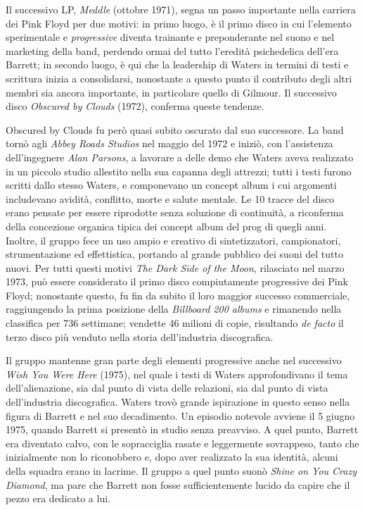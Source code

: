 \documentclass[class=book, crop=false, oneside, 12pt]{standalone}
\begin{document}
    Il successivo LP, \emph{Meddle} (ottobre 1971), segna un passo importante nella carriera dei Pink Floyd per due motivi: in primo luogo, è il primo disco in cui l'elemento sperimentale e \emph{progressive} diventa trainante e preponderante nel suono e nel marketing della band, perdendo ormai del tutto l'eredità psichedelica dell'era Barrett; in secondo luogo, è qui che la leadership di Waters in termini di testi e scrittura inizia a consolidarsi, nonostante a questo punto il contributo degli altri membri sia ancora importante, in particolare quello di Gilmour. Il successivo disco \emph{Obscured by Clouds} (1972), conferma queste tendenze.

    Obscured by Clouds fu però quasi subito oscurato dal suo successore. La band tornò agli \emph{Abbey Roads Studios} nel maggio del 1972 e iniziò, con l'assistenza dell'ingegnere \emph{Alan Parsons}, a lavorare a delle demo che Waters aveva realizzato in un piccolo studio allestito nella sua capanna degli attrezzi; tutti i testi furono scritti dallo stesso Waters, e componevano un concept album i cui argomenti includevano avidità, conflitto, morte e salute mentale. Le 10 tracce del disco erano pensate per essere riprodotte senza soluzione di continuità, a riconferma della concezione organica tipica dei concept album del prog di quegli anni. Inoltre, il gruppo fece un uso ampio e creativo di sintetizzatori, campionatori, strumentazione ed effettistica, portando al grande pubblico dei suoni del tutto nuovi. Per tutti questi motivi \emph{The Dark Side of the Moon}, rilasciato nel marzo 1973, può essere considerato il primo disco compiutamente progressive dei Pink Floyd; nonostante questo, fu fin da subito il loro maggior successo commerciale, raggiungendo la prima posizione della \emph{Billboard 200 albums} e rimanendo nella classifica per 736 settimane; vendette 46 milioni di copie, risultando \emph{de facto} il terzo disco più venduto nella storia dell'industria discografica.

    Il gruppo mantenne gran parte degli elementi progressive anche nel successivo \emph{Wish You Were Here} (1975), nel quale i testi di Waters approfondivano il tema dell'alienazione, sia dal punto di vista delle relazioni, sia dal punto di vista dell'industria discografica. Waters trovò grande ispirazione in questo senso nella figura di Barrett e nel suo decadimento. Un episodio notevole avviene il 5 giugno 1975, quando Barrett si presentò in studio senza preavviso. A quel punto, Barrett era diventato calvo, con le sopracciglia rasate e leggermente sovrappeso, tanto che inizialmente non lo riconobbero e, dopo aver realizzato la sua identità, alcuni della squadra erano in lacrime. Il gruppo a quel punto suonò \emph{Shine on You Crazy Diamond}, ma pare che Barrett non fosse sufficientemente lucido da capire che il pezzo era dedicato a lui.
\end{document}
